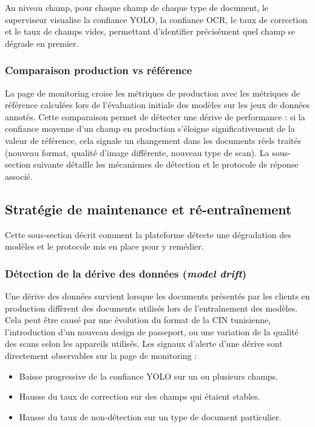 Au niveau champ, pour chaque champ de chaque type de document, le superviseur visualise la confiance YOLO, la confiance OCR, le taux de correction et le taux de champs vides, permettant d'identifier précisément quel champ se dégrade en premier.

\subsubsection{Comparaison production vs référence}

La page de monitoring croise les métriques de production avec les métriques de référence calculées lors de l'évaluation initiale des modèles sur les jeux de données annotés. Cette comparaison permet de détecter une dérive de performance : si la confiance moyenne d'un champ en production s'éloigne significativement de la valeur de référence, cela signale un changement dans les documents réels traités (nouveau format, qualité d'image différente, nouveau type de scan). La sous-section suivante détaille les mécanismes de détection et le protocole de réponse associé.

\subsection{Stratégie de maintenance et ré-entraînement}
\label{subsec:maintenance-reentrainement}

Cette sous-section décrit comment la plateforme détecte une dégradation des modèles et le protocole mis en place pour y remédier.

\subsubsection{Détection de la dérive des données (\textit{model drift})}

Une dérive des données survient lorsque les documents présentés par les clients en production diffèrent des documents utilisés lors de l'entraînement des modèles. Cela peut être causé par une évolution du format de la CIN tunisienne, l'introduction d'un nouveau design de passeport, ou une variation de la qualité des scans selon les appareils utilisés. Les signaux d'alerte d'une dérive sont directement observables sur la page de monitoring :

\begin{itemize}
  \item Baisse progressive de la confiance YOLO sur un ou plusieurs champs.
  \item Hausse du taux de correction sur des champs qui étaient stables.
  \item Hausse du taux de non-détection sur un type de document particulier.
\end{itemize}


